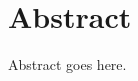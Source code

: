 \documentclass[../main.tex]{subfiles}
\begin{document}
\section*{Abstract}

Abstract goes here.





    
\end{document}
